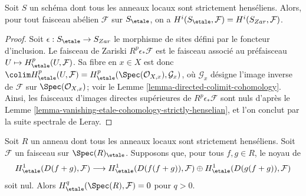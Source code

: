 \begin{lemma}
\label{lemma-local-rings-strictly-henselian}
Soit $S$ un schéma dont tous les anneaux locaux sont strictement henséliens.
Alors, pour tout faisceau abélien $\mathcal{F}$ sur $S_\etale$, on a
$H^i(S_\etale, \mathcal{F}) = H^i(S_{Zar}, \mathcal{F})$.
\end{lemma}

\begin{proof}
Soit $\epsilon : S_\etale \to S_{Zar}$ le morphisme de sites défini
par le foncteur d'inclusion. Le faisceau de Zariski $R^p\epsilon_*\mathcal{F}$
est le faisceau associé au préfaisceau $U \mapsto H^p_\etale(U, \mathcal{F})$.
Sa fibre en $x \in X$ est donc
$\colim H^p_\etale(U, \mathcal{F}) =
H^p_\etale(\Spec(\mathcal{O}_{X, x}), \mathcal{G}_x)$,
où $\mathcal{G}_x$ désigne l'image inverse de $\mathcal{F}$
sur $\Spec(\mathcal{O}_{X, x})$; voir le
Lemme \ref{lemma-directed-colimit-cohomology}.
Ainsi, les faisceaux d'images directes supérieures de $R^p\epsilon_*\mathcal{F}$ sont
nuls d'après le
Lemme \ref{lemma-vanishing-etale-cohomology-strictly-henselian},
et l'on conclut par la suite spectrale de Leray.
\end{proof}

\begin{lemma}
\label{lemma-gabber-criterion}
Soit $R$ un anneau dont tous les anneaux locaux sont strictement henséliens.
Soit $\mathcal{F}$ un faisceau sur $\Spec(R)_\etale$.
Supposons que, pour tous $f,g\in R$, le noyau de
$$
H^1_\etale(D(f + g), \mathcal{F})
\longrightarrow
H^1_\etale(D(f(f + g)), \mathcal{F}) \oplus
H^1_\etale(D(g(f + g)), \mathcal{F})
$$
soit nul. Alors $H^q_\etale(\Spec(R), \mathcal{F}) = 0$ pour $q > 0$.
\end{lemma}

